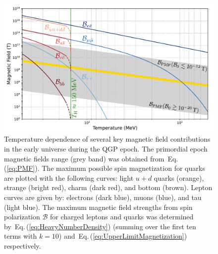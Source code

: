 \documentclass[epjST]{svjour}
\newcommand{\req}[1]{Eq.\,(\ref{#1})}
\begin{document}
\begin{figure}%
\centerline{
\includegraphics[width=0.90\columnwidth]{Figure_1_v4.pdf}}
\caption{\label{Figure_1}Temperature dependence of several key magnetic field contributions in the early universe during the QGP epoch. {\color{blue}The primordial epoch magnetic fields range (grey band) was obtained from~\req{eq:PMF}. The maximum possible spin magnetization for quarks are plotted with the following curves: light \(u+d\) quarks (orange), strange (bright red), charm (dark red), and bottom (brown). Lepton curves are given by: electrons (dark blue), muons (blue), and tau (light blue). The maximum magnetic field strengths from spin polarization \(\mathcal{B}\) for charged leptons and quarks was determined by~\req{eq:HeavyNumberDensity} (summing over the first ten terms with \(k=10\)) and~\req{eq:UpperLimitMagnetization} respectively.}}
\end{figure}
\end{document}
